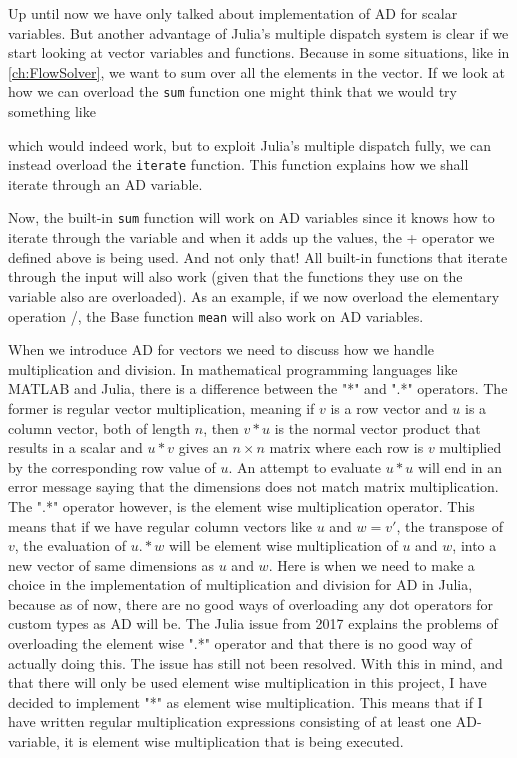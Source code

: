 Up until now we have only talked about implementation of AD for scalar variables. But another advantage of Julia's multiple dispatch system is clear if we start looking at vector variables and functions. Because in some situations, like in \autoref{ch:FlowSolver}, we want to sum over all the elements in the vector. If we look at how we can overload the \texttt{sum} function one might think that we would try something like

which would indeed work, but to exploit Julia's multiple dispatch fully, we can instead overload the \texttt{iterate} function. This function explains how we shall iterate through an AD variable. 

Now, the built-in \texttt{sum} function will work on AD variables since it knows how to iterate through the variable and when it adds up the values, the + operator we defined above is being used. And not only that! All built-in functions that iterate through the input will also work (given that the functions they use on the variable also are overloaded). As an example, if we now overload the elementary operation /, the Base function \texttt{mean} will also work on AD variables.

When we introduce AD for vectors we need to discuss how we handle multiplication and division. In mathematical programming languages like MATLAB and Julia, there is a difference between the "*" and ".*" operators. The former is regular vector multiplication, meaning if $v$ is a row vector and $u$ is a column vector, both of length $n$, then $v*u$ is the normal vector product that results in a scalar and $u*v$ gives an $n\times n$ matrix where each row is $v$ multiplied by the corresponding row value of $u$. An attempt to evaluate $u*u$ will end in an error message saying that the dimensions does not match matrix multiplication. The ".*" operator however, is the element wise multiplication operator. This means that if we have regular column vectors like $u$ and $w = v'$, the transpose of $v$, the evaluation of $u.*w$ will be element wise multiplication of $u$ and $w$, into a new vector of same dimensions as $u$ and $w$. Here is when we need to make a choice in the implementation of multiplication and division for AD in Julia, because as of now, there are no good ways of overloading any dot operators for custom types as AD will be. The Julia issue \emph{\citep{JuliaIssueDot}} from 2017 explains the problems of overloading the element wise ".*" operator and that there is no good way of actually doing this. The issue has still not been resolved. With this in mind, and that there will only be used element wise multiplication in this project, I have decided to implement "*" as element wise multiplication. This means that if I have written regular multiplication expressions consisting of at least one AD-variable, it is element wise multiplication that is being executed.

